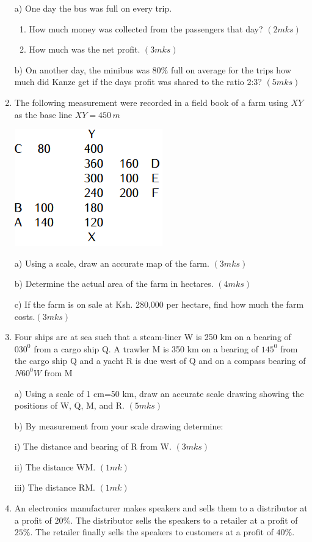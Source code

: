 \documentclass[
  a4paperpaper,
]{scrbook}
\begin{document}
\begin{tcolorbox}
\begin{enumerate}
  a) One day the bus was full on every trip.

  \begin{enumerate}
  \def\labelenumii{\roman{enumii})}
  \item
    How much money was collected from the passengers that day?
    \((2mks)\)
  \item
    How much was the net profit. \((3mks)\)
  \end{enumerate}

  b) On another day, the minibus was 80\% full on average for the trips
  how much did Kanze get if the days profit was shared to the ratio 2:3?
  \((5mks)\)
\item
  The following measurement were recorded in a field book of a farm
  using \(XY\) as the base line \(XY = 450\,m\)

  \includegraphics{images/MP1_Q18.png}

  a) Using a scale, draw an accurate map of the farm. \((3mks)\)

  b) Determine the actual area of the farm in hectares. \((4mks)\)

  c) If the farm is on sale at Ksh. 280,000 per hectare, find how much
  the farm costs.\((3mks)\)
\item
  Four ships are at sea such that a steam-liner W is 250 km on a bearing
  of \(030^0\) from a cargo ship Q. A trawler M is 350 km on a bearing
  of \(145^0\) from the cargo ship Q and a yacht R is due west of Q and
  on a compass bearing of \(N60^0W\) from M

  a) Using a scale of 1 cm=50 km, draw an accurate scale drawing showing
  the positions of W, Q, M, and R. \((5mks)\)

  b) By measurement from your scale drawing determine:

  i) The distance and bearing of R from W. \((3mks)\)

  ii) The distance WM. \((1mk)\)

  iii) The distance RM. \((1mk)\)
\item
  An electronics manufacturer makes speakers and sells them to a
  distributor at a profit of \(20\%\). The distributor sells the
  speakers to a retailer at a profit of \(25\%\). The retailer finally
  sells the speakers to customers at a profit of \(40\%\).


\end{enumerate}
\end{tcolorbox}
\end{document}
